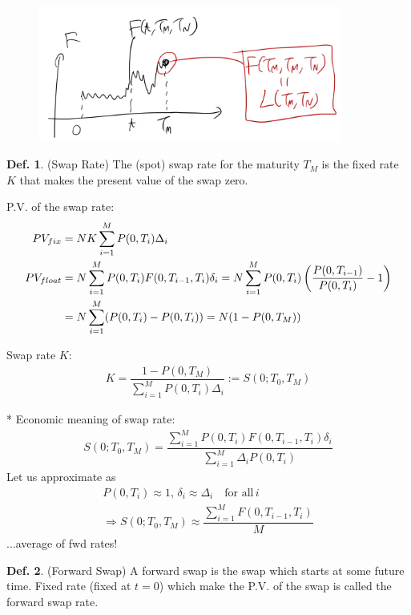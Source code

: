 \documentclass[a4paper,11pt]{jsarticle}
\theoremstyle{definition}
\newtheorem{definition}{Def.}[subsection]
\newcommand{\df}[2]{\dfrac{#1}{#2}}
\begin{document}
\begin{figure}[H]　%
  \begin{center}
    \includegraphics[width=10cm]{fig/1_3_02.JPG}
  \end{center}
\end{figure}


\begin{definition}{(Swap Rate)}
  The (spot) swap rate for the maturity $T_M$ is the fixed rate $K$
  that makes the present value of the swap zero.
\end{definition}

P.V. of the swap rate:
\begin{align}
  PV_{fix}&=NK\sum_{i=1}^M P(0,T_i)\Delta_i \\
  PV_{float}&=N\sum_{i=1}^M P(0,T_i)F(0,T_{i-1},T_i)\delta_i
  =N\sum_{i=1}^M P(0,T_i)
  \left(\df{P(0,T_{i-1})}{P(0,T_i)}-1\right) \notag \\
  &=N\sum_{i=1}^M (P(0,T_i)-P(0,T_i))
  =N(1-P(0,T_M))
\end{align}

Swap rate $K$:
\begin{align}
  K=\df{1-P(0,T_M)}{\sum_{i=1}^M P(0,T_i)\Delta_i}
  :=S(0;T_0,T_M)
\end{align}

* Economic meaning of swap rate:
\begin{align}
  S(0;T_0,T_M)
  =\df{\sum_{i=1}^M P(0,T_i)F(0,T_{i-1},T_i)\delta_i}
  {\sum_{i=1}^M \Delta_i P(0,T_i)}
\end{align}
Let us approximate as
\begin{align}\label{swap_fwd}
  P(0,T_i)\approx 1, \, \delta_i\approx\Delta_i
  \quad \mbox{for all} \, i \\
  \Rightarrow
  S(0;T_0,T_M)\approx\df{\sum_{i=1}^M F(0,T_{i-1},T_i)}{M} 
\end{align}
...average of fwd rates!

\begin{definition}{(Forward Swap)}
  A forward swap is the swap which starts at some future time.
  Fixed rate (fixed at $t=0$) which make the P.V. of the swap
  is called the forward swap rate.
\end{definition}
\end{document}
